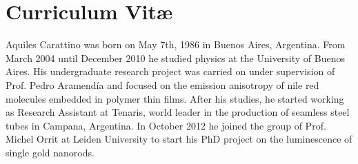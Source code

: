 \chapter*{Curriculum Vit\ae}

Aquiles Carattino was born on May 7th, 1986 in Buenos Aires, Argentina. From
March 2004 until December 2010 he studied physics at the University of Buenos
Aires. His undergraduate research project was carried on under supervision of
Prof. Pedro Aramend\'{i}a and focused on the emission anisotropy of nile red
molecules embedded in polymer thin films. After his studies, he started working
as Research Assistant at Tenaris, world leader in the production of seamless
steel tubes in Campana, Argentina. In October 2012 he joined the group of Prof.
Michel Orrit at Leiden University to start his PhD project on the luminescence
of single gold nanorods.
